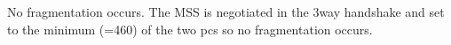 No fragmentation occurs.
The MSS is negotiated in the 3way handshake and set to the minimum (=460) of the two pcs so no
fragmentation occurs.
